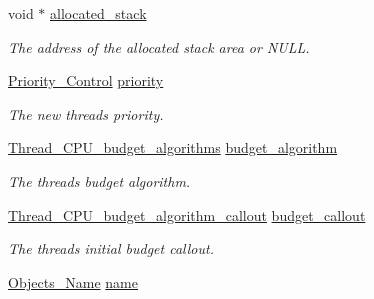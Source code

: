 \begin{DoxyCompactItemize}
void $\ast$ \mbox{\hyperlink{structThread__Configuration_a99abd507251abbc1b51303641440fdd2}{allocated\+\_\+stack}}
\begin{DoxyCompactList}\small\item\em The address of the allocated stack area or N\+U\+LL. \end{DoxyCompactList}\item 
\mbox{\label{structThread__Configuration_a285e69a79f6621e3ec8cb76dac7be036}} 
\mbox{\hyperlink{group__RTEMSScorePriority_ga59d02b58072d31a9a1cfe644557aefe2}{Priority\+\_\+\+Control}} \mbox{\hyperlink{structThread__Configuration_a285e69a79f6621e3ec8cb76dac7be036}{priority}}
\begin{DoxyCompactList}\small\item\em The new thread\textquotesingle{}s priority. \end{DoxyCompactList}\item 
\mbox{\label{structThread__Configuration_a992c7dce8ab06d71619a77c149f8ac3e}} 
\mbox{\hyperlink{group__RTEMSScoreThread_gab6f48556812ffc781a69df144ef49be0}{Thread\+\_\+\+C\+P\+U\+\_\+budget\+\_\+algorithms}} \mbox{\hyperlink{structThread__Configuration_a992c7dce8ab06d71619a77c149f8ac3e}{budget\+\_\+algorithm}}
\begin{DoxyCompactList}\small\item\em The thread\textquotesingle{}s budget algorithm. \end{DoxyCompactList}\item 
\mbox{\label{structThread__Configuration_a0138f5dee84042cc073c274e95534cdf}} 
\mbox{\hyperlink{group__RTEMSScoreThread_ga2f15cbe9653e5bfcb2595454e9ffd14a}{Thread\+\_\+\+C\+P\+U\+\_\+budget\+\_\+algorithm\+\_\+callout}} \mbox{\hyperlink{structThread__Configuration_a0138f5dee84042cc073c274e95534cdf}{budget\+\_\+callout}}
\begin{DoxyCompactList}\small\item\em The thread\textquotesingle{}s initial budget callout. \end{DoxyCompactList}\item 
\mbox{\label{structThread__Configuration_a373b8ea2920ae2bf1651bc79bafe1148}} 
\mbox{\hyperlink{unionObjects__Name}{Objects\+\_\+\+Name}} \mbox{\hyperlink{structThread__Configuration_a373b8ea2920ae2bf1651bc79bafe1148}{name}}

\end{DoxyCompactItemize}
